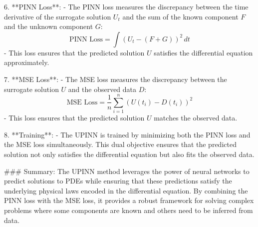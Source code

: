 6. **PINN Loss**:
   - The PINN loss measures the discrepancy between the time derivative of the surrogate solution \( U_t \) and the sum of the known component \( F \) and the unknown component \( G \):
     \[
     \text{PINN Loss} = \int \left( U_t - (F + G) \right)^2 \, dt
     \]
   - This loss ensures that the predicted solution \( U \) satisfies the differential equation approximately.

7. **MSE Loss**:
   - The MSE loss measures the discrepancy between the surrogate solution \( U \) and the observed data \( D \):
     \[
     \text{MSE Loss} = \frac{1}{n} \sum_{i=1}^n \left( U(t_i) - D(t_i) \right)^2
     \]
   - This loss ensures that the predicted solution \( U \) matches the observed data.

8. **Training**:
   - The UPINN is trained by minimizing both the PINN loss and the MSE loss simultaneously. This dual objective ensures that the predicted solution not only satisfies the differential equation but also fits the observed data.

### Summary:
The UPINN method leverages the power of neural networks to predict solutions to PDEs while ensuring that these predictions satisfy the underlying physical laws encoded in the differential equation. By combining the PINN loss with the MSE loss, it provides a robust framework for solving complex problems where some components are known and others need to be inferred from data.